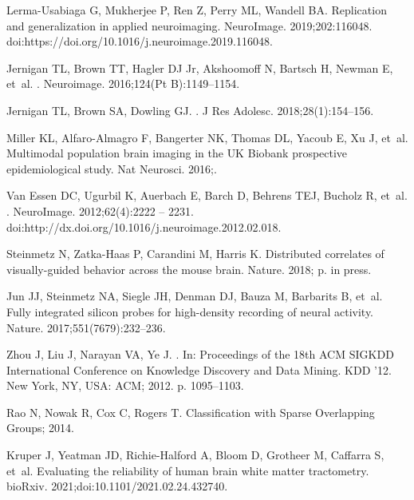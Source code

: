 \documentclass[10pt,letterpaper]{article}
\begin{document}
\begin{thebibliography}{100}
Lerma-Usabiaga G, Mukherjee P, Ren Z, Perry ML, Wandell BA.
\newblock Replication and generalization in applied neuroimaging.
\newblock NeuroImage. 2019;202:116048.
\newblock doi:{https://doi.org/10.1016/j.neuroimage.2019.116048}.

Jernigan TL, Brown TT, Hagler DJ Jr, Akshoomoff N, Bartsch H, Newman E, et~al.
.
\newblock Neuroimage. 2016;124(Pt B):1149--1154.

Jernigan TL, Brown SA, Dowling GJ.
.
\newblock J Res Adolesc. 2018;28(1):154--156.

Miller KL, Alfaro-Almagro F, Bangerter NK, Thomas DL, Yacoub E, Xu J, et~al.
\newblock Multimodal population brain imaging in the {UK} {B}iobank prospective
  epidemiological study.
\newblock Nat Neurosci. 2016;.

{Van Essen} DC, Ugurbil K, Auerbach E, Barch D, Behrens TEJ, Bucholz R, et~al.
.
\newblock NeuroImage. 2012;62(4):2222 -- 2231.
\newblock doi:{http://dx.doi.org/10.1016/j.neuroimage.2012.02.018}.

Steinmetz N, Zatka-Haas P, Carandini M, Harris K.
\newblock Distributed correlates of visually-guided behavior across the mouse
  brain.
\newblock Nature. 2018; p. in press.

Jun JJ, Steinmetz NA, Siegle JH, Denman DJ, Bauza M, Barbarits B, et~al.
\newblock Fully integrated silicon probes for high-density recording of neural
  activity.
\newblock Nature. 2017;551(7679):232--236.

Zhou J, Liu J, Narayan VA, Ye J.
.
\newblock In: Proceedings of the 18th {ACM} {SIGKDD} International Conference
  on Knowledge Discovery and Data Mining. KDD '12. New York, NY, USA: ACM;
  2012. p. 1095--1103.

Rao N, Nowak R, Cox C, Rogers T. Classification with Sparse Overlapping Groups;
  2014.

Kruper J, Yeatman JD, Richie-Halford A, Bloom D, Grotheer M, Caffarra S, et~al.
\newblock Evaluating the reliability of human brain white matter tractometry.
\newblock bioRxiv. 2021;doi:{10.1101/2021.02.24.432740}.


\end{thebibliography}
\end{document}

